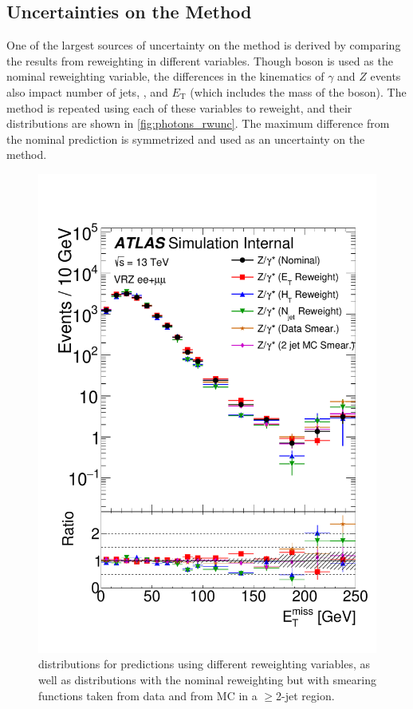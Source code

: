 
\subsection{Uncertainties on the \gjets Method}

One of the largest sources of uncertainty on the \gjets method is derived by comparing the results from reweighting in different variables. Though boson \pt is used as the nominal reweighting variable, the differences in the kinematics of $\gamma$ and $Z$ events also impact number of jets, \HT, and $E_{\text{T}}$ (which includes the mass of the boson). The \gjets method is repeated using each of these variables to reweight, and their \met distributions are shown in \autoref{fig:photons_rwunc}. The maximum difference from the nominal prediction is symmetrized and used as an uncertainty on the method. 

\begin{centering}
\begin{figure}[bth]
\myfloatalign
\includegraphics[width=.85\linewidth]{figures/photons/GJ_Variations_ee+mm_zmet_onz.pdf}
\caption{\met distributions for \gjets predictions using different reweighting variables, as well as distributions with the nominal reweighting but with smearing functions taken from data and from \ac{MC} in a $\geq$2-jet region.}
\label{fig:photons_rwunc}
\end{figure}
\end{centering}

